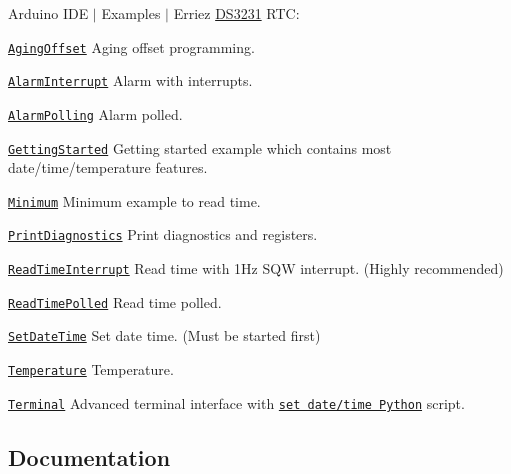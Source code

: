 Arduino I\+DE $\vert$ Examples $\vert$ Erriez \hyperlink{class_d_s3231}{D\+S3231} R\+TC\+:


\begin{DoxyItemize}
\item \href{https://github.com/Erriez/ErriezDS3231/blob/master/examples/AgingOffset/AgingOffset.ino}{\tt Aging\+Offset} Aging offset programming.
\item \href{https://github.com/Erriez/ErriezDS3231/blob/master/examples/AlarmInterrupt/AlarmInterrupt.ino}{\tt Alarm\+Interrupt} Alarm with interrupts.
\item \href{https://github.com/Erriez/ErriezDS3231/blob/master/examples/AlarmPolling/AlarmPolling.ino}{\tt Alarm\+Polling} Alarm polled.
\item \href{https://github.com/Erriez/ErriezDS3231/blob/master/examples/GettingStarted/GettingStarted.ino}{\tt Getting\+Started} Getting started example which contains most date/time/temperature features.
\item \href{https://github.com/Erriez/ErriezDS3231/blob/master/examples/Minimum/Minimum.ino}{\tt Minimum} Minimum example to read time.
\item \href{https://github.com/Erriez/ErriezDS3231/blob/master/examples/PrintDiagnostics/PrintDiagnostics.ino}{\tt Print\+Diagnostics} Print diagnostics and registers.
\item \href{https://github.com/Erriez/ErriezDS3231/blob/master/examples/ReadTimeInterrupt/ReadTimeInterrupt.ino}{\tt Read\+Time\+Interrupt} Read time with 1\+Hz S\+QW interrupt. (Highly recommended)
\item \href{https://github.com/Erriez/ErriezDS3231/blob/master/examples/ReadTimePolled/ReadTimePolled.ino}{\tt Read\+Time\+Polled} Read time polled.
\item \href{https://github.com/Erriez/ErriezDS3231/blob/master/examples/SetDateTime/SetDateTime.ino}{\tt Set\+Date\+Time} Set date time. (Must be started first)
\item \href{https://github.com/Erriez/ErriezDS3231/blob/master/examples/Temperature/Temperature.ino}{\tt Temperature} Temperature.
\item \href{https://github.com/Erriez/ErriezDS3231/blob/master/examples/Terminal/Terminal.ino}{\tt Terminal} Advanced terminal interface with \href{https://github.com/Erriez/ErriezDS3231/blob/master/examples/Terminal/Terminal.py}{\tt set date/time Python} script.
\end{DoxyItemize}

\subsection*{Documentation}


